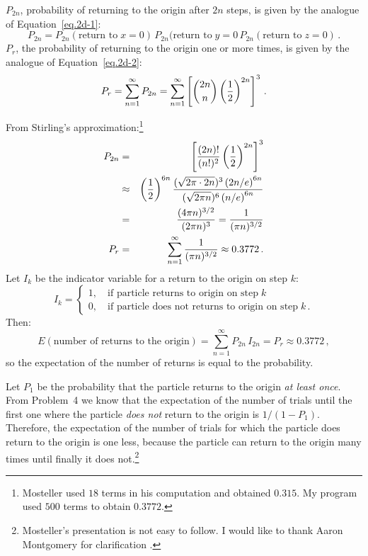 $P_{2n}$, probability of returning to the origin after $2n$ steps, is given by the analogue of Equation~\ref{eq.2d-1}:
\[
P_{2n} =
P_{2n}(\textrm{return to}\;x=0)\,P_{2n}(\textrm{return to}\;y=0\, P_{2n}(\textrm{return to}\;z=0)\,.
\]
$P_r$, the probability of returning to the origin one or more times, is given by the analogue of Equation~\ref{eq.2d-2}:
\[
P_r =\sum_{n=1}^{\infty}P_{2n} =
\sum_{n=1}^{\infty}\left[\displaystyle{2n \choose n}\left(\displaystyle\frac{1}{2}\right)^{2n}\right]^3\,.
\]

From Stirling's approximation:\footnote{Mosteller used $18$ terms in his computation and obtained $0.315$. My program used $500$ terms to obtain $0.3772$.}
\begin{eqnarray*}
P_{2n} &=&
\left[\displaystyle\frac{(2n)!}{(n!)^2}
\left(\displaystyle\frac{1}{2}\right)^{2n}\right]^3 \\
&\approx&
\left(\displaystyle\frac{1}{2}\right)^{6n}
\displaystyle\frac{(\sqrt{2\pi \cdot 2n})^3
         \left(2n/e\right)^{6n}}{(\sqrt{2\pi n})^{6}
         \left(n/e\right)^{6n}} \\
&=&\displaystyle\frac{(4\pi n)^{3/2}}{(2\pi n)^3}=
 \displaystyle\frac{1}{(\pi n)^{3/2}}\\
P_r &=& \sum_{n=1}^{\infty}\displaystyle\frac{1}{(\pi n)^{3/2}}\approx 0.3772\,.
\end{eqnarray*}
Let $I_k$ be the indicator variable for a return to the origin on step $k$:
\begin{equation}
I_k=
\left\{
\begin{array}{ll}
1,\quad\textrm{if particle returns to origin on step}\;k\\
0, \quad\textrm{if particle does not returns to origin on step}\;k\,.
\end{array}
\right.
\end{equation}
Then:
\[
E(\textrm{number of returns to the origin})=\sum_{n=1}^{\infty}P_{2n}\, I_{2n} = P_r\approx 0.3772\,,
\]
so the expectation of the number of returns is equal to the probability.

 Let $P_1$ be the probability that the particle returns to the origin \emph{at least once}.  From Problem~4 we know that the expectation of the number of trials until the first one where the particle \emph{does not} return to the origin is $1/(1-P_1)$. Therefore, the expectation of the number of trials for which the particle does return to the origin is one less, because the particle can return to the origin many times until finally it does not.\footnote{Mosteller's presentation is not easy to follow. I would like to thank Aaron Montgomery for clarification \cite{montgomery}.}

